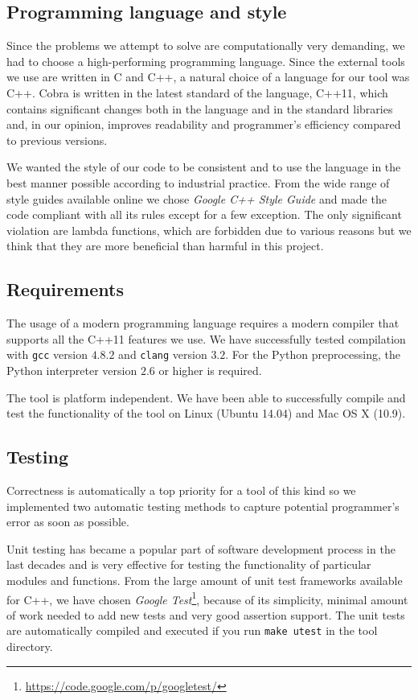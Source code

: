 \subsection{Programming language and style}

Since the problems we attempt to solve are computationally very demanding,
  we had to choose a high-performing programming language.
Since the external tools we use are written in C and C++,
  a natural choice of a language for our tool was C++.
Cobra is written in the latest standard of the language, C++11, which
  contains significant changes both in the language and in the standard libraries
  and, in our opinion, improves readability and programmer's efficiency
  compared to previous versions.

We wanted the style of our code to be consistent and to use
  the language in the best manner possible according to industrial practice.
From the wide range of style guides available online
  we chose \emph{Google C++ Style Guide}\cite{googlestyle} and made
  the code compliant with all its rules except for a few exception.
The only significant violation are lambda functions, which are forbidden
  due to various reasons
  but we think that they are more beneficial than harmful in this project.

\subsection{Requirements}

The usage of a modern programming language requires
  a modern compiler that supports all the C++11 features we use.
We have successfully tested compilation with
 \texttt{gcc} version $4.8.2$ and
 \texttt{clang} version $3.2$.
For the Python preprocessing, the Python interpreter version $2.6$ or higher is required.

The tool is platform independent.
We have been able to successfully compile and test the functionality of the tool
  on Linux (Ubuntu 14.04) and Mac OS X (10.9).

\subsection{Testing}
Correctness is automatically a top priority for a tool of this kind so
  we implemented two automatic testing methods to
  capture potential programmer's error as soon as possible.

Unit testing has became a popular part of software development process
  in the last decades and is very effective for testing the functionality
  of particular modules and functions.
From the large amount of unit test frameworks available for C++,
  we have chosen \emph{Google Test}\footnote{\url{https://code.google.com/p/googletest/}},
  because of its simplicity, minimal amount of work needed to add new tests
  and very good assertion support.
The unit tests are automatically compiled and executed if you run \texttt{make utest}
  in the tool directory.

